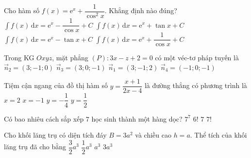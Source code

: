 \begin{ex}%
	Cho hàm số $f(x)=\mathrm{e}^x+\dfrac{1}{\cos^2x}$. Khẳng định nào đúng?
	\choice
	{$\displaystyle\int f(x) \mathrm{\,d}x=\mathrm{e}^x-\dfrac{1}{\cos x}+C$}
	{\True $\displaystyle\int f(x) \mathrm{\,d}x=\mathrm{e}^x+\tan x+C$}
	{$\displaystyle\int f(x) \mathrm{\,d}x=\mathrm{e}^x-\tan x+C$}
	{$\displaystyle\int f(x) \mathrm{\,d}x=\mathrm{e}^x+\dfrac{1}{\cos x}+C$}
\end{ex}
\begin{ex}%
	Trong KG $Oxyz$, mặt phẳng $(P)\colon 3x-z+2=0$ có một véc-tơ pháp tuyến là
	\choice
	{$\vec{n}_2=(3;-1;0)$}
	{\True $\vec{n}_3=(3;0;-1)$}
	{$\vec{n}_1=(3;-1;2)$}
	{$\vec{n}_4=(-1;0;-1)$}
\end{ex}
\begin{ex}%
	Tiệm cận ngang của đồ thị hàm số $y=\dfrac{x+1}{2x-4}$ là đường thẳng có phương trình là
	\choice
	{$x=2$}
	{$x=-1$}
	{$y=-\dfrac{1}{4}$}
	{\True $y=\dfrac{1}{2}$}
\end{ex}
\begin{ex}%
	Có bao nhiêu cách sắp xếp $7$ học sinh thành một hàng dọc?
	\choice
	{$7^7$}
	{$6!$}
	{$7$}
	{\True $7!$}
\end{ex}
\begin{ex}%
	Cho khối lăng trụ có diện tích đáy $B=3a^2$ và chiều cao $h=a$. Thể tích của khối lăng trụ đã cho bằng
	\choice
	{$\dfrac{3}{2}a^3$}
	{$\dfrac{1}{2}a^3$}
	{$a^3$}
	{\True $3a^3$}
\end{ex}
